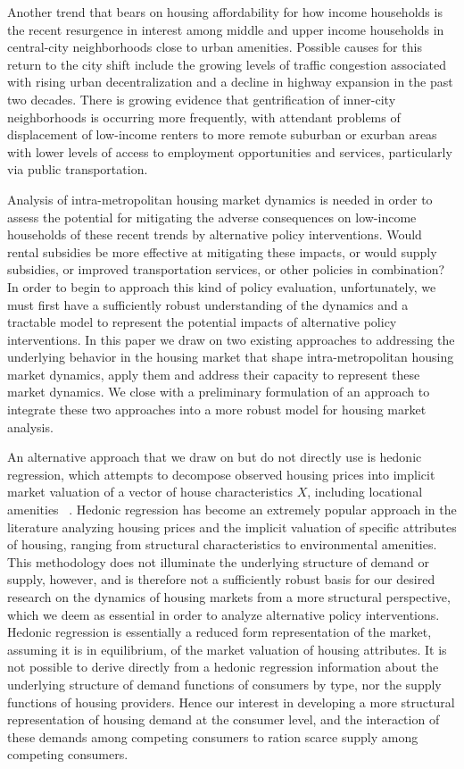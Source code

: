 \documentclass{article}
\begin{document}
Another trend that bears on housing affordability for how income households is
the recent resurgence in interest among middle and upper income households in
central-city neighborhoods close to urban amenities.  Possible
causes for this return to the city shift include the growing levels of traffic
congestion associated with rising urban decentralization and a decline in
highway expansion in the past two decades. There is growing evidence that
gentrification of inner-city neighborhoods is occurring more frequently,
with attendant problems of displacement of low-income renters to
more remote suburban or exurban areas with lower levels of access to employment
opportunities and services, particularly via public transportation.

Analysis of intra-metropolitan housing market dynamics is needed in order to
assess the potential for mitigating the adverse consequences on low-income
households of these recent trends by alternative policy interventions.  Would
rental subsidies be more effective at mitigating these impacts, or would supply
subsidies, or improved transportation services, or other policies in combination?
In order to begin to approach this kind of policy evaluation, unfortunately, we
must first have a sufficiently robust understanding of the dynamics and a tractable
model to represent the potential impacts of alternative policy interventions.  In this
paper we draw on two existing approaches to addressing the underlying behavior in the
housing market that shape intra-metropolitan housing market dynamics, apply them and
address their capacity to represent these market dynamics.  We close with a preliminary
formulation of an approach to integrate these two approaches into a more robust
model for housing market analysis.

An alternative approach that we draw on but do not directly use is hedonic regression, which attempts to
decompose observed housing prices into implicit market valuation of a vector of
house characteristics $X$, including locational amenities ~\cite{Rosen1974a,Sheppard1999}.
Hedonic regression has become an extremely popular approach in the literature analyzing housing prices and the
implicit valuation of specific attributes of housing, ranging from
structural characteristics to environmental amenities.  This methodology
does not illuminate the underlying structure of demand or supply, however,
and is therefore not a sufficiently robust basis for our desired research on the dynamics
of housing markets from a more structural perspective, which we deem as essential in order to analyze
alternative policy interventions.  Hedonic regression
is essentially a reduced form representation of the market, assuming it is
in equilibrium, of the market valuation of housing attributes.  It is not
possible to derive directly from a hedonic regression information about the
underlying structure of demand functions of consumers by type, nor the
supply functions of housing providers.  Hence our interest in developing
a more structural representation of housing demand at the consumer level, and the
interaction of these demands among competing consumers to ration scarce supply among
competing consumers.
\end{document}
